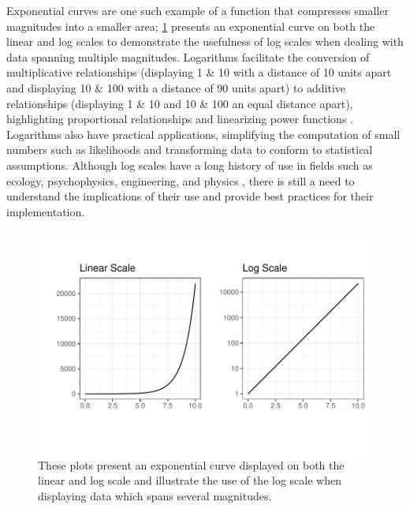 \documentclass[12pt]{article}
\begin{document}
Exponential curves are one such example of a function that compresses
smaller magnitudes into a smaller area; \cref{fig:log-scales} presents
an exponential curve on both the linear and log scales to demonstrate
the usefulness of log scales when dealing with data spanning multiple
magnitudes. Logarithms facilitate the conversion of multiplicative
relationships (displaying 1 \& 10 with a distance of 10 units apart and
displaying 10 \& 100 with a distance of 90 units apart) to additive
relationships (displaying 1 \& 10 and 10 \& 100 an equal distance
apart), highlighting proportional relationships and linearizing power
functions \citep{menge_logarithmic_2018}. Logarithms also have practical
applications, simplifying the computation of small numbers such as
likelihoods and transforming data to conform to statistical assumptions.
Although log scales have a long history of use in fields such as
ecology, psychophysics, engineering, and physics
\citep{heckler_student_2013, waddell2005comparisons}, there is still a
need to understand the implications of their use and provide best
practices for their implementation.

\begin{figure}[tbp]

{\centering \includegraphics[width=1\linewidth,]{logarithmic-lineups_files/figure-latex/log-scales-1} 

}

\caption[Linear scale versus log scale]{These plots present an exponential curve displayed on both the linear and log scale and illustrate the use of the log scale when displaying data which spans several magnitudes.}\label{fig:log-scales}
\end{figure}
\end{document}
